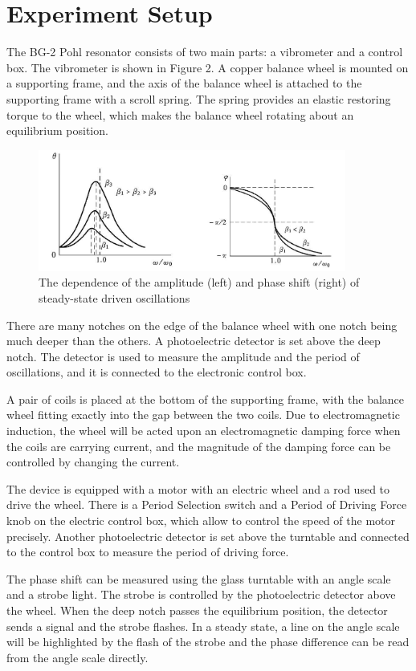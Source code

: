 \section{Experiment Setup}
    The BG-2 Pohl resonator consists of two main parts: a vibrometer and a control box. The vibrometer is shown in Figure 2. A copper balance wheel is mounted on a supporting frame, and the axis of the balance wheel is attached to the supporting frame with a scroll spring. The spring provides an elastic restoring torque to the wheel, which makes the balance wheel rotating about an equilibrium position.
    \begin{figure}[H]
    \centering
        \includegraphics[width=0.9\textwidth]{images/1}
        \caption{The dependence of the amplitude (left) and phase shift (right) of steady-state driven oscillations}\label{aps}
    \end{figure}
    There are many notches on the edge of the balance wheel with one notch being much deeper than the others. A photoelectric detector is set above the deep notch. The detector is used to measure the amplitude and the period of oscillations, and it is connected to the electronic control box.

    A pair of coils is placed at the bottom of the supporting frame, with the balance wheel fitting exactly into the gap between the two coils. Due to electromagnetic induction, the wheel will be acted upon an electromagnetic damping force when the coils are carrying current, and the magnitude of the damping force can be controlled by changing the current.

    The device is equipped with a motor with an electric wheel and a rod used to drive the wheel. There is a Period Selection switch and a Period of Driving Force knob on the electric control box, which allow to control the speed of the motor precisely. Another photoelectric detector is set above the turntable and connected to the control box to measure the period of driving force.

    The phase shift can be measured using the glass turntable with an angle scale and a strobe light. The strobe is controlled by the photoelectric detector above the wheel. When the deep notch passes the equilibrium position, the detector sends a signal and the strobe flashes. In a steady state, a line on the angle scale will be highlighted by the flash of the strobe and the phase difference can be read from the angle scale directly.


